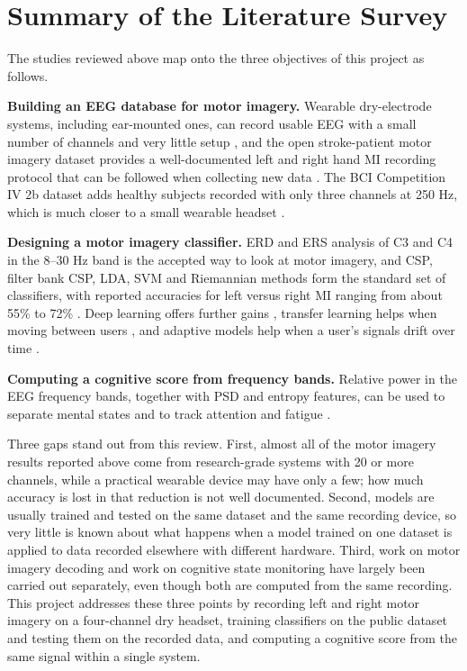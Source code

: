 \section{Summary of the Literature Survey}

The studies reviewed above map onto the three objectives of this project as follows.

\textbf{Building an EEG database for motor imagery.} Wearable dry-electrode systems,
including ear-mounted ones, can record usable EEG with a small number of channels and very
little setup \cite{mullen2015wearable, kappel2019earEEG}, and the open stroke-patient motor
imagery dataset provides a well-documented left and right hand MI recording protocol that
can be followed when collecting new data \cite{liu2024mi}. The BCI Competition IV 2b
dataset adds healthy subjects recorded with only three channels at 250 Hz, which is much
closer to a small wearable headset \cite{leeb2007virtual}.

\textbf{Designing a motor imagery classifier.} ERD and ERS analysis of C3 and C4 in the
8--30 Hz band is the accepted way to look at motor imagery, and CSP, filter bank CSP,
LDA, SVM and Riemannian methods form the standard set of classifiers, with reported
accuracies for left versus right MI ranging from about 55\% to 72\%
\cite{liu2024mi}. Deep learning offers further gains \cite{xu2023review,
song2023conformer}, transfer learning helps when moving between users
\cite{jerrin2021imagined}, and adaptive models help when a user's signals drift over time
\cite{su2024hybrid}.

\textbf{Computing a cognitive score from frequency bands.} Relative power in the EEG
frequency bands, together with PSD and entropy features, can be used to separate mental
states and to track attention and fatigue \cite{bird2018mental, jawed2024visual,
ming2021drowsiness, jiri2025drowsiness}.

Three gaps stand out from this review. First, almost all of the motor imagery results
reported above come from research-grade systems with 20 or more channels, while a practical
wearable device may have only a few; how much accuracy is lost in that reduction is not
well documented. Second, models are usually trained and tested on the same dataset and the
same recording device, so very little is known about what happens when a model trained on
one dataset is applied to data recorded elsewhere with different hardware. Third, work on
motor imagery decoding and work on cognitive state monitoring have largely been carried out
separately, even though both are computed from the same recording. This project addresses
these three points by recording left and right motor imagery on a four-channel dry
headset, training classifiers on the public dataset and testing them on the recorded data,
and computing a cognitive score from the same signal within a single system.